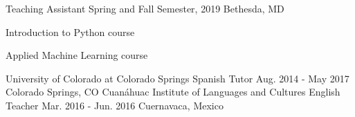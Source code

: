 

\begin{cventries}
  {Teaching Assistant}
  {Spring and Fall Semester, 2019}
  {Bethesda, MD}
  {
    \begin{cvitems}
      \item {Introduction to Python course}
      \item {Applied Machine Learning course}
    \end{cvitems}
  }
  \cventry
    {University of Colorado at Colorado Springs} %
    {Spanish Tutor} %
    {Aug. 2014 - May 2017} %
    {Colorado Springs, CO} %
    {
    }
  \cventry
  	{Cuanáhuac Institute of Languages and Cultures} %
    {English Teacher} %
    {Mar. 2016 - Jun. 2016} %
    {Cuernavaca, Mexico} %
    {
      \begin{cvitems} %
      \end{cvitems}
    }
    
   
\end{cventries}
